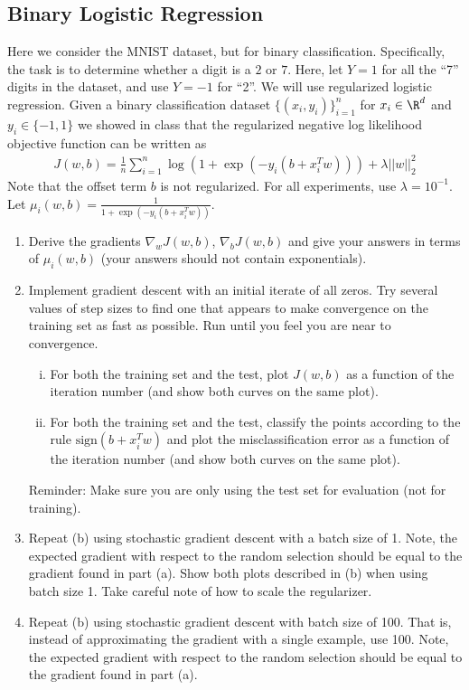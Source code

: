 \documentclass{article}
\begin{document}
\subsection*{Binary Logistic Regression} 
\begin{aprob}
    Here we consider the MNIST dataset, but for binary classification. Specifically, the task is to determine whether a digit is a $2$ or $7$.
    Here, let $Y=1$ for all the ``7'' digits in the dataset, and use $Y=-1$ for ``2''.
    We will use regularized logistic regression. 
    Given a binary classification dataset $\{(x_i,y_i)\}_{i=1}^n$ for $x_i \in \R^d$ and $y_i \in \{-1,1\}$ we showed in class that the regularized negative log likelihood objective function can be written as
    \begin{align*}
    J(w,b) = \frac{1}{n} \sum_{i=1}^n \log( 1 + \exp(-y_i (b + x_i^T w))) + \lambda ||w||_2^2
    \end{align*} 
    Note that the offset term $b$ is not regularized. 
    For all experiments, use $\lambda = 10^{-1}$. 
    Let $\mu_i(w,b) = \frac{1}{1+ \exp(-y_i (b + x_i^T w))}$. 
    \begin{enumerate}
        \item {} Derive the gradients $\nabla_w J(w,b)$, $\nabla_{b} J(w,b)$ and give your answers in terms of $\mu_i(w,b)$ (your answers should not contain exponentials).
        \item {} Implement gradient descent with an initial iterate of all zeros. Try several values of step sizes to find one that appears to make convergence on the training set as fast as possible. Run until you feel you are near to convergence.
        \begin{enumerate}[(i)]
            \item For both the training set and the test, plot $J(w,b)$ as a function of the iteration number (and show both curves on the same plot).  
            \item For both the training set and the test, classify the points according to the rule $\text{sign}(b + x_i^T w)$ and plot the misclassification error as a function of the iteration number (and show both curves on the same plot). 
        \end{enumerate}
          
        Reminder: Make sure you are only using the test set for evaluation (not for training).
          
        \item {} Repeat (b) using stochastic gradient descent with a batch size of 1. Note, the expected gradient with respect to the random selection should be equal to the gradient found in part (a). Show both plots described in (b) when using batch size 1. Take careful note of how to scale the regularizer.
        \item {} Repeat (b) using stochastic gradient descent with batch size of 100. That is, instead of approximating the gradient with a single example, use 100. Note, the expected gradient with respect to the random selection should be equal to the gradient found in part (a).
    \end{enumerate}
    

\end{aprob}
\end{document}
